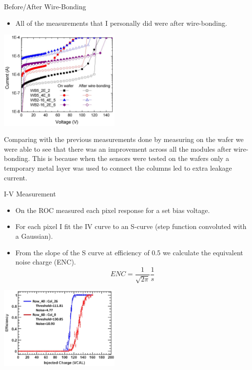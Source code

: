 \documentclass{beamer}
\begin{document}
\begin{frame}{Before/After Wire-Bonding}
  \begin{center}
    \begin{itemize}
    \item
      All of the measurements that I personally did were after wire-bonding.
     \end{itemize}
\includegraphics[width=0.45\textwidth]{images/IV_ba.pdf}

  \small    Comparing with the previous measurements done by measuring on the wafer we were able to see that there was an improvement across all the modules after wire-bonding. This is because when the sensors were tested on the wafers only a temporary metal layer was used to connect the columns led to extra leakage current.


 \end{center}
\end{frame}


\begin{frame}{I-V Measurement}
  \begin{center}
    \begin{itemize}
    \item
      On the ROC measured each pixel response for a set bias voltage.
    \item
      For each pixel I fit the IV curve to an S-curve (step function convoluted with a Gaussian).
    \item
      From the slope of the S curve at efficiency of 0.5 we calculate the equivalent noise charge (ENC).
      \begin{equation} ENC = \dfrac{1}{\sqrt{2\pi}}\dfrac{1}{s} \end{equation}
     \end{itemize}
\includegraphics[width=0.45\textwidth]{images/efficiency.pdf}

  \end{center}
\end{frame}
\end{document}
